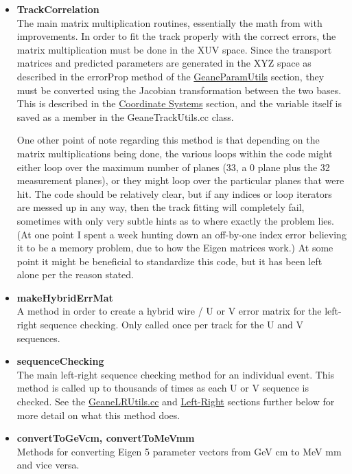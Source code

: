 \begin{enumerate}
        \begin{itemize}

          \item{\bf{TrackCorrelation}} \\
          The main matrix multiplication routines, essentially the math from \cite{geanemanual} with improvements. In order to fit the track properly with the correct errors, the matrix multiplication must be done in the XUV space. Since the transport matrices and predicted parameters are generated in the XYZ space as described in the errorProp method of the \hyperref[sec:GeaneParamUtils]{GeaneParamUtils} section, they must be converted using the Jacobian transformation between the two bases. This is described in the \hyperref[sec:Coord]{Coordinate Systems} section, and the variable itself is saved as a member in the GeaneTrackUtils.cc class. 

          One other point of note regarding this method is that depending on the matrix multiplications being done, the various loops within the code might either loop over the maximum number of planes (33, a 0 plane plus the 32 measurement planes), or they might loop over the particular planes that were hit. The code should be relatively clear, but if any indices or loop iterators are messed up in any way, then the track fitting will completely fail, sometimes with only very subtle hints as to where exactly the problem lies. (At one point I spent a week hunting down an off-by-one index error believing it to be a memory problem, due to how the Eigen matrices work.) At some point it might be beneficial to standardize this code, but it has been left alone per the reason stated.

          \item{\bf{makeHybridErrMat}} \\
          A method in order to create a hybrid wire / U or V error matrix for the left-right sequence checking. Only called once per track for the U and V sequences.

          \item{\bf{sequenceChecking}} \\ 
          The main left-right sequence checking method for an individual event. This method is called up to thousands of times as each U or V sequence is checked. See the \hyperref[sec:GeaneLRUtils]{GeaneLRUtils.cc} and \hyperref[sec:LR]{Left-Right} sections further below for more detail on what this method does.

          \item{\bf{convertToGeVcm, convertToMeVmm}} \\
          Methods for converting Eigen 5 parameter vectors from GeV cm to MeV mm and vice versa.


\end{itemize}
\end{enumerate}
